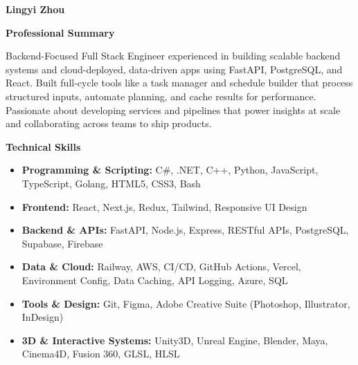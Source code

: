 \documentclass[lettersized,9pt]{article}
\newcommand{\header}[1]{\textbf{\normalsize #1}\vspace{-2pt}}
\begin{document}
\fontsize{7.5pt}{9pt}\selectfont

\begin{center}
  {\Large \textbf{Lingyi Zhou}} \\[4pt]
\end{center}

\header{Professional Summary}

Backend-Focused Full Stack Engineer experienced in building scalable backend systems and cloud-deployed, data-driven apps using FastAPI, PostgreSQL, and React. Built full-cycle tools like a task manager and schedule builder that process structured inputs, automate planning, and cache results for performance. Passionate about developing services and pipelines that power insights at scale and collaborating across teams to ship products.

\header{Technical Skills}

\begin{itemize}
  \item \textbf{Programming \& Scripting:} C\#, .NET, C++, Python, JavaScript, TypeScript, Golang, HTML5, CSS3, Bash
  \item \textbf{Frontend:} React, Next.js, Redux, Tailwind, Responsive UI Design
  \item \textbf{Backend \& APIs:} FastAPI, Node.js, Express, RESTful APIs, PostgreSQL, Supabase, Firebase
  \item \textbf{Data \& Cloud:} Railway, AWS, CI/CD, GitHub Actions, Vercel, Environment Config, Data Caching, API Logging, Azure, SQL
  \item \textbf{Tools \& Design:} Git, Figma, Adobe Creative Suite (Photoshop, Illustrator, InDesign)
  \item \textbf{3D \& Interactive Systems:} Unity3D, Unreal Engine, Blender, Maya, Cinema4D, Fusion 360, GLSL, HLSL
\end{itemize}
\end{document}
